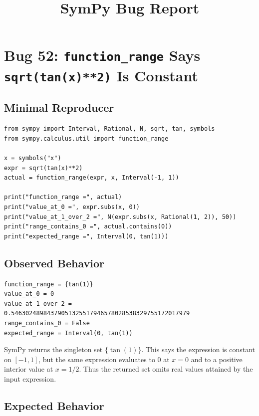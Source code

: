 \documentclass[11pt]{article}
\title{SymPy Bug Report}
\date{}
\begin{document}
\author{}
\maketitle

\section{Bug 52: \texttt{function\_range} Says \texttt{sqrt(tan(x)**2)} Is Constant}

\subsection{Minimal Reproducer}

\medskip

\begin{lstlisting}[style=bugpython]
from sympy import Interval, Rational, N, sqrt, tan, symbols
from sympy.calculus.util import function_range

x = symbols("x")
expr = sqrt(tan(x)**2)
actual = function_range(expr, x, Interval(-1, 1))

print("function_range =", actual)
print("value_at_0 =", expr.subs(x, 0))
print("value_at_1_over_2 =", N(expr.subs(x, Rational(1, 2)), 50))
print("range_contains_0 =", actual.contains(0))
print("expected_range =", Interval(0, tan(1)))
\end{lstlisting}

\subsection{Observed Behavior}

\medskip

\begin{lstlisting}[style=bugpython]
function_range = {tan(1)}
value_at_0 = 0
value_at_1_over_2 = 0.54630248984379051325517946578028538329755172017979
range_contains_0 = False
expected_range = Interval(0, tan(1))
\end{lstlisting}

SymPy returns the singleton set \(\{\tan(1)\}\). This says the expression is
constant on \([-1,1]\), but the same expression evaluates to \(0\) at \(x=0\)
and to a positive interior value at \(x=1/2\). Thus the returned set omits real
values attained by the input expression.

\subsection{Expected Behavior}
\end{document}
